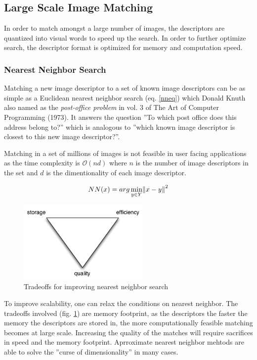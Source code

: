 \documentclass[english,12pt,a4paper,pdftex,elec,utf8]{aaltothesis}
\begin{document}


\subsection{Large Scale Image Matching}

In order to match amongst a large number of images, the descriptors are quantized into visual words to speed up the search. In order to further optimize search, the descriptor format is optimized for memory and computation speed. \cite{Jegou2010}

\subsubsection{Nearest Neighbor Search}
Matching a new image descriptor to a set of known image descriptors can be as simple as a Euclidean nearest neighbor search (eq. \ref{nneq}) which Donald Knuth also named as the \emph{post-office problem} in vol. 3 of The Art of Computer Programming (1973). It answers the question ''To which post office does this address belong to?'' which is analogous to ''which known image descriptor is closest to this new image descriptor?''.

Matching in a set of millions of images is not feasible in user facing applications as the time complexity is $\mathcal{O}(nd)$ where $n$ is the number of image descriptors in the set and $d$ is the dimentionality of each image descriptor.


\begin{equation}
\label{nneq}
NN(x) = arg \min_{y\in Y}\norm{x-y}^2
\end{equation}

\begin{figure}[htb]
\begin{center}
\includegraphics[height=4cm]{figures/nntradeoffs}
\end{center}
\caption{Tradeoffs for improving nearest neighbor search}
\label{nntradeoffs}
\end{figure}

To improve scalability, one can relax the conditions on nearest neighbor. The tradeoffs involved (fig. \ref{nntradeoffs}) are memory footprint, as the descriptors the faster the memory the descriptors are stored in, the more computationally feasible matching becomes at large scale. Increasing the quality of the matches will require sacrifices in speed and the memory footprint. Aprroximate nearest neighbor mehtods are able to solve the ''curse of dimensionality'' in many cases.
\end{document}
